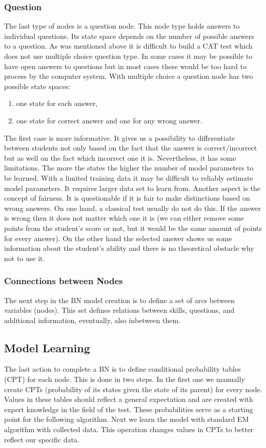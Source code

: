 \subsubsection{Question}

The last type of nodes is a question node. This node type holds answers to individual questions. Its state space depends on the number of possible answers to a question. As was mentioned above it is difficult to build a CAT test which does not use multiple choice question type. In some cases it may be possible to have open answers to questions but in most cases these would be too hard to process by the computer system. With multiple choice a question node has two possible state spaces:
\begin{enumerate}
	\item one state for each answer,
	\item one state for correct answer and one for any wrong answer.
\end{enumerate}
The first case is more informative. It gives us a possibility to differentiate between students not only based on the fact that the answer is correct/incorrect but as well on the fact which incorrect one it is. Nevertheless, it has some limitations. The more the states the higher the number of model parameters to be learned. With a limited training data it may be difficult to reliably estimate model parameters. It requires larger data set to learn from. Another aspect is the concept of fairness. It is questionable if it is fair to make distinctions based on wrong answers. On one hand, a classical test usually do not do this. If the answer is wrong then it does not matter which one it is (we can either remove some points from the student's score or not, but it would be the same amount of points for every answer). On the other hand the selected answer shows us some information about the student's ability and there is no theoretical obstacle why not to use it.

\subsubsection{Connections between Nodes}

The next step in the BN model creation is to define a set of arcs between variables (nodes). This set defines relations between skills, questions, and additional information, eventually, also inbetween them.  

\subsection{Model Learning}
The last action to complete a BN is to define conditional probability tables (CPT) for each node. This is done in two steps. In the first one we manually create CPTs (probability of its states given the state of its parent) for every node. Values in these tables should reflect a general expectation and are created with expert knowledge in the field of the test. These probabilities serve as a starting point for the following algorithm. Next we learn the model with standard EM algorithm with collected data. This operation changes values in CPTs to better reflect our specific data.

